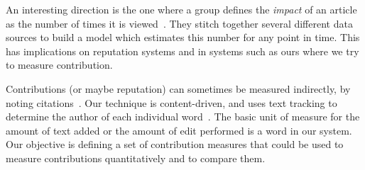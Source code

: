 An interesting direction is the one where a group defines the 
\textit{impact} of an article as the number of times it is 
viewed~\cite{WikiImpact2007}. 
They stitch together several different data sources to build a model 
which estimates this number for any point in time.
This has implications on reputation systems and in systems such as
ours where we try to measure contribution.

Contributions (or maybe reputation) can sometimes be measured 
indirectly, by noting 
citations~\cite{PageRank98,AckCounting2004,WikiMTWtrust06}.
Our technique is content-driven, and uses text tracking
to determine the author of each individual 
word~\cite{RankingControversies2008,Adler2007}.
The basic unit of measure for the amount of text added or the
amount of edit performed is a word in our system.
Our objective is defining a set of contribution measures
that could be used to measure contributions quantitatively
and to compare them.

